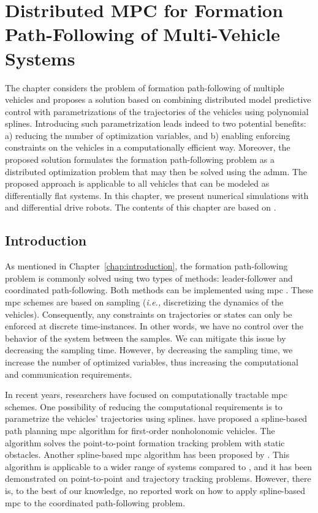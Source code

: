 \chapter{Distributed MPC for Formation Path-Following of Multi-Vehicle Systems}
\label{chap:handpos_MPC}


The chapter considers the problem of formation path-following of multiple vehicles and proposes a solution based on combining distributed model predictive control with parametrizations of the trajectories of the vehicles using polynomial splines. Introducing such parametrization leads indeed to two potential benefits: a) reducing the number of optimization variables, and b) enabling enforcing constraints on the vehicles in a computationally efficient way. Moreover, the proposed solution formulates the formation path-following problem as a distributed optimization problem that may then be solved using the \gls{admm}.
The proposed approach is applicable to all vehicles that can be modeled as differentially flat systems.
In this chapter, we present numerical simulations with  and differential drive robots.
The contents of this chapter are based on \cite{matous_MPC_2022}.

\section{Introduction}
    
As mentioned in Chapter~\ref{chap:introduction}, the formation path-following problem is commonly solved using two types of methods: leader-follower and coordinated path-following.
Both methods can be implemented using \acrfull{mpc} \cite{wang_path_2021,kanjanawanishkul_distributed_2008}.
These \gls{mpc} schemes are based on sampling (\emph{i.e.,} discretizing the dynamics of the vehicles).
Consequently, any constraints on trajectories or states can only be enforced at discrete time-instances.
In other words, we have no control over the behavior of the system between the samples.
We can mitigate this issue by decreasing the sampling time.
However, by decreasing the sampling time, we increase the number of optimized variables, thus increasing the computational and communication requirements.

In recent years, researchers have focused on computationally tractable \gls{mpc} schemes.
One possibility of reducing the computational requirements is to parametrize the vehicles' trajectories using splines.
\cite{saska_2016_predictive} have proposed a spline-based path planning \gls{mpc} algorithm for first-order nonholonomic vehicles.
The algorithm solves the point-to-point formation tracking problem with static obstacles.
Another spline-based \gls{mpc} algorithm has been proposed by \cite{van_parys_2017_DMPC}.
This algorithm is applicable to a wider range of systems compared to \cite{saska_2016_predictive}, and it has been demonstrated on point-to-point and trajectory tracking problems.
However, there is, to the best of our knowledge, no reported work on how to apply spline-based \gls{mpc} to the coordinated path-following problem.

